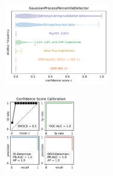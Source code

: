 \begin{figure}[H]
    \centering
    \begin{subfigure}
        \centering
        \includegraphics[width=0.505\textwidth,valign=t]{ood-detection/figures/confidence-score/ood.gaussianprocesspercentiledetector-distribution.pdf}
    \end{subfigure}
    \begin{subfigure}
        \centering
        \includegraphics[width=0.345\textwidth,valign=t]{ood-detection/figures/confidence-score/ood.gaussianprocesspercentiledetector-calibration.pdf}
    \end{subfigure}


\end{figure}
